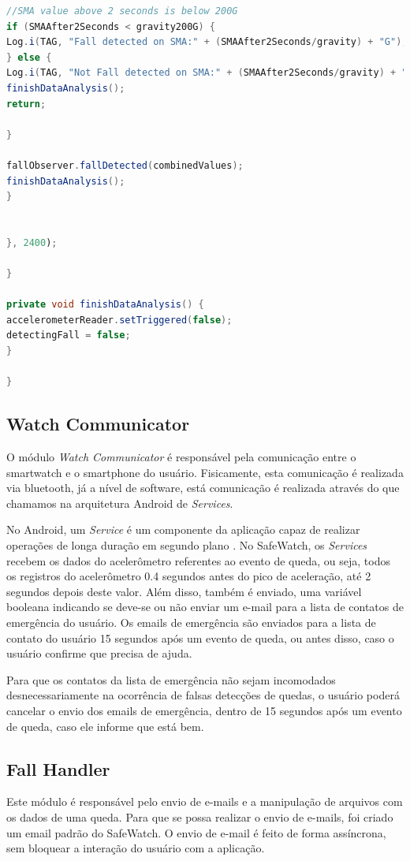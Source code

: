 \begin{lstlisting}[caption=Algoritmo de Detecção de Quedas em Java, label=cod:java, language=JAVA, frame=single, breaklines=true]
//SMA value above 2 seconds is below 200G
if (SMAAfter2Seconds < gravity200G) {
Log.i(TAG, "Fall detected on SMA:" + (SMAAfter2Seconds/gravity) + "G");
} else {
Log.i(TAG, "Not Fall detected on SMA:" + (SMAAfter2Seconds/gravity) + "G");
finishDataAnalysis();
return;

}

fallObserver.fallDetected(combinedValues);
finishDataAnalysis();
}


}, 2400);

}

private void finishDataAnalysis() {
accelerometerReader.setTriggered(false);
detectingFall = false;
}

}

 \end{lstlisting}

\subsection{Watch Communicator}
O módulo \textit{Watch Communicator} é responsável pela comunicação entre o smartwatch e o smartphone do usuário. Fisicamente, esta comunicação é realizada via bluetooth, já a nível de software, está comunicação é realizada através do que chamamos na arquitetura Android de \textit{Services}.

No Android, um \textit{Service} é um componente da aplicação capaz de realizar operações de longa duração em segundo plano \cite{servicesAndroidDocs}. No SafeWatch, os \textit{Services} recebem os dados do acelerômetro referentes ao evento de queda, ou seja, todos os registros do acelerômetro 0.4 segundos antes do pico de aceleração, até 2 segundos depois deste valor. Além disso, também é enviado, uma variável booleana indicando se deve-se ou não enviar um e-mail para a lista de contatos de emergência do usuário. Os emails de emergência são enviados para a lista de contato do usuário 15 segundos após um evento de queda, ou antes disso, caso o usuário confirme que precisa de ajuda. 

Para que os contatos da lista de emergência não sejam incomodados desnecessariamente na ocorrência de falsas detecções de quedas, o usuário poderá cancelar o envio dos emails de emergência, dentro de 15 segundos após um evento de queda, caso ele informe que está bem.

\subsection{Fall Handler} 
Este módulo é responsável pelo envio de e-mails e a manipulação de arquivos com os dados de uma queda. Para que se possa realizar o envio de e-mails, foi criado um email padrão do SafeWatch. O envio de e-mail é feito de forma assíncrona, sem bloquear a interação do usuário com a aplicação. 

